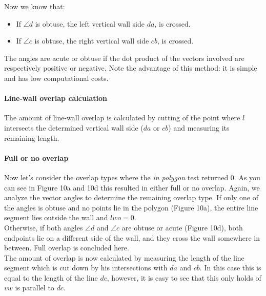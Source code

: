 	Now we know that:
	\begin{itemize}
	\item If $\angle d$ is obtuse, the left vertical wall side $da$, is
	crossed. \\
	\item If $\angle c$ is obtuse, the right vertical wall side $cb$, is
	crossed. \\
	\end{itemize}
	The angles are acute or obtuse if the dot product of the vectors involved
	are respectively positive or negative. 
	Note the advantage of this method: 
	it is simple and has low computational costs.
	
	\paragraph{Line-wall overlap calculation}
	The amount of line-wall overlap is calculated by cutting of the
	point where $l$ intersects the determined vertical wall side ($da$ or
	$cb$) and measuring its remaining length.\\

	\paragraph{Full or no overlap}
	Now let's consider the overlap types where the \emph{in polygon} test
	returned 0.
	As you can see in Figure 10a and 10d this resulted in either full or no overlap.
	Again, we analyze the vector angles to determine the remaining overlap type.
	If only one of the angles is obtuse and no points lie in the polygon
	(Figure 10a), the entire line segment lies outside the wall and $lwo = 0$.\\
	Otherwise, if both angles $\angle d$ and $\angle c$ are obtuse or acute (Figure 10d),
	both endpoints lie on a different side of the wall, and they cross the wall somewhere in
	between. Full overlap is concluded here. \\
	
	The amount of overlap is now calculated by measuring the length
	of the line segment which is cut down by his intersections with $da$ and
	$cb$. In this case this is equal to the length of the line $dc$, however, it
	is easy to see that this only holds of $vw$ is parallel to $dc$.
	
